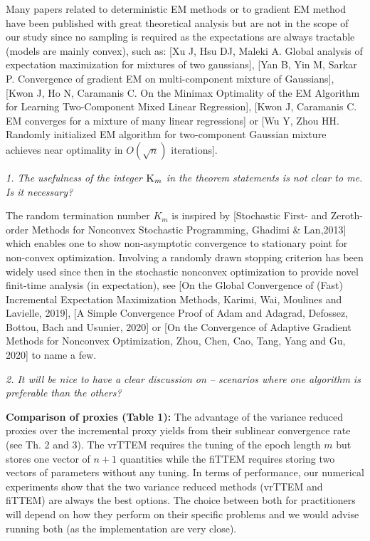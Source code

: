 \documentclass[anon,12pt]{alt2021} %
\begin{document}
Many papers related to deterministic EM methods or to gradient EM method have been published with great theoretical analysis but are not in the scope of our study since no sampling is required as the expectations are always tractable (models are mainly convex), such as: [Xu J, Hsu DJ, Maleki A. Global analysis of expectation maximization for mixtures of two gaussians], [Yan B, Yin M, Sarkar P. Convergence of gradient EM on multi-component mixture of Gaussians], [Kwon J, Ho N, Caramanis C. On the Minimax Optimality of the EM Algorithm for Learning Two-Component Mixed Linear Regression], [Kwon J, Caramanis C. EM converges for a mixture of many linear regressions] or [Wu Y, Zhou HH. Randomly initialized EM algorithm for two-component Gaussian mixture achieves near optimality in $ O (\sqrt {n}) $ iterations].


\vspace{0.05in}
\textit{1. The usefulness of the integer $\textsc{K}_m$ in the theorem statements is not clear to me. Is it necessary?}
\vspace{0.05in}

The random termination number  $K_m$ is inspired by [Stochastic First- and Zeroth-order Methods for Nonconvex Stochastic Programming, Ghadimi \& Lan,2013] which enables one to show non-asymptotic convergence to stationary point for non-convex optimization. 
Involving a randomly drawn stopping criterion has been widely used since then in the stochastic nonconvex optimization to provide novel finit-time analysis (in expectation), see [On the Global Convergence of (Fast) Incremental Expectation Maximization Methods, Karimi, Wai, Moulines and Lavielle, 2019], [A Simple Convergence Proof of Adam and Adagrad, Defossez, Bottou, Bach and Usunier, 2020] or [On the Convergence of Adaptive Gradient Methods for Nonconvex Optimization, Zhou, Chen, Cao, Tang, Yang and Gu, 2020] to name a few.

\vspace{0.05in}
\textit{2. It will be nice to have a clear discussion on -- \textit{scenarios where one algorithm is preferable than the others?}}
\vspace{0.05in}

\textbf{Comparison of proxies (Table 1):} 
The advantage of the variance reduced proxies over the incremental proxy yields from their sublinear convergence rate (see Th. 2 and 3). 
The vrTTEM requires the tuning of the epoch length $m$ but stores one vector of $n+1$ quantities while the fiTTEM requires storing two vectors of parameters without any tuning.
In terms of performance, our numerical experiments show that the two variance reduced methods (vrTTEM and fiTTEM) are always the best options. 
The choice between both for practitioners will depend on how they perform on their specific problems and we would advise running both (as the implementation are very close).
\end{document}
